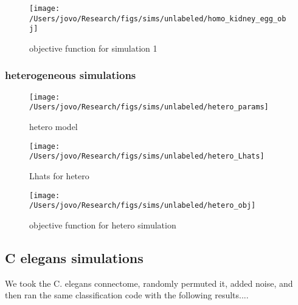 \begin{figure}[!ht]
\centering \texttt{[image: /Users/jovo/Research/figs/sims/unlabeled/homo\_kidney\_egg\_obj]}
\caption{objective function for simulation 1}
\label{fig:sim1_params}
\end{figure}





\subsubsection{heterogeneous simulations} %
\label{ssub:heterogeneous_simulations}

\begin{figure}[htbp]
	\centering		\texttt{[image: /Users/jovo/Research/figs/sims/unlabeled/hetero\_params]}
	\caption{hetero model}
	\label{fig:models}
\end{figure}

\begin{figure}[htbp]
	\centering			\texttt{[image: /Users/jovo/Research/figs/sims/unlabeled/hetero\_Lhats]}
	\caption{Lhats for hetero}
	\label{fig:figs_Sims_unlabeled_LPvsFW500}
\end{figure}


\begin{figure}[!ht]
\centering \texttt{[image: /Users/jovo/Research/figs/sims/unlabeled/hetero\_obj]}
\caption{objective function for hetero simulation}
\label{fig:sim1_params}
\end{figure}







\subsection{C elegans simulations} %
\label{sub:c_elegans_simulations}


We took the C. elegans connectome, randomly permuted it, added noise, and then ran the same classification code with the following results....


